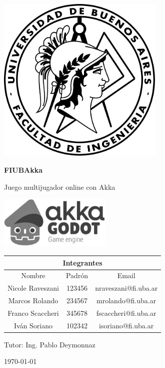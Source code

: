 \documentclass[11pt]{article}
\newcommand{\mytitlefont}{\fontsize{50}{60}\selectfont}
\begin{document}

\begin{titlepage}
    \centering
    \includegraphics[width=0.6\textwidth]{../assets/fiuba-logo.png} %
    \vspace{1cm}

    {\mytitlefont \textbf{FIUBAkka}} %
    \vspace{0.5cm}

    {\Large Juego multijugador online con Akka} %
    \vspace{2cm}

    \centering
    \includegraphics[width=0.4\textwidth]{../assets/FIUBAkka-logo-bw.png} %
    \vspace{1cm}

    \begin{table}[h!]
      \centering
      \begin{tabular}{|c|c|c|}
          \hline
          \multicolumn{3}{|c|}{\textbf{Integrantes}} \\
          \hline\hline
          Nombre & Padrón & Email \\
          \hline\hline
          Nicole Raveszani & 123456 & nraveszani@fi.uba.ar \\
          \hline
          Marcos Rolando & 234567 & mrolando@fi.uba.ar \\
          \hline
          Franco Scaccheri & 345678 & fscaccheri@fi.uba.ar \\
          \hline
          Iván Soriano & 102342 & isoriano@fi.uba.ar \\
          \hline
      \end{tabular}
    \end{table}

    \begin{center}
      Tutor: Ing. Pablo Deymonnaz
    \end{center}


    \today %
\end{titlepage}
\end{document}
